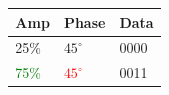 \documentclass[]{beamer}
\begin{document}
\begin{frame}
\begin{columns}[T]
\begin{column}[T]{5cm}
        \end{column}
        \begin{column}[T]{5cm}
            \begin{table}[]
                \begin{tabular}{lll}
                    Amp  & Phase & Data \\
                    \hline
                    25\% & $45^{\circ}$  & 0000 \\
                    \textcolor{green}{75\%} & \textcolor{red}{$45^{\circ}$} & \textcolor{cyan!50}{0011} \\
                \end{tabular}
            \end{table}
        \end{column}
    \end{columns}
\end{frame}
\end{document}
